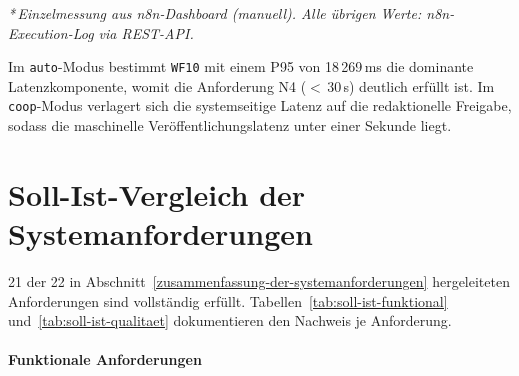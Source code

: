 \emph{*\,Einzelmessung aus n8n-Dashboard (manuell). Alle übrigen Werte: n8n-Execution-Log via REST-API.}

Im \texttt{auto}-Modus bestimmt \texttt{WF10} mit einem P95 von 18\,269\,ms die dominante Latenzkomponente, womit die Anforderung N4 ($<$\,30\,s) deutlich erfüllt ist. Im \texttt{coop}-Modus verlagert sich die systemseitige Latenz auf die redaktionelle Freigabe, sodass die maschinelle Veröffentlichungslatenz unter einer Sekunde liegt.

\section{Soll-Ist-Vergleich der Systemanforderungen}\label{anforderungsabgleich-soll-ist-vergleich}\label{technische-qualitätssicherung}

21 der 22 in Abschnitt~\ref{zusammenfassung-der-systemanforderungen} hergeleiteten Anforderungen sind vollständig erfüllt. Tabellen~\ref{tab:soll-ist-funktional} und~\ref{tab:soll-ist-qualitaet} dokumentieren den Nachweis je Anforderung.

\newpage
\paragraph{Funktionale Anforderungen}

